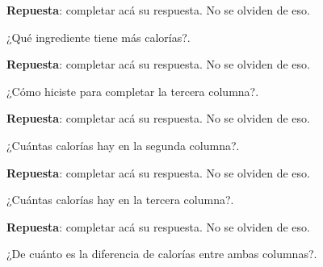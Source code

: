 \documentclass[10pt]{examdesign}
\begin{document}
\begin{shortanswer}[title={\textit{Receta que le dijo la Abuela Pocha a Ana y
    			Juan.}},
    	rearrange=no,resetcounter=no]
\begin{question}
\begin{center}
\begin{tabular}{|c|c|c|}
    			\end{tabular}
    		\end{center}
    		\begin{answer}
    			\textbf{Repuesta}: completar acá su respuesta. No se olviden de eso.
    		\end{answer}
    	\end{question}
        \begin{question}
        	¿Qué ingrediente tiene más calorías?.
        	\begin{answer}
        		\textbf{Repuesta}: completar acá su respuesta. No se olviden de eso.
        	\end{answer}
        \end{question}
        \begin{question}
        	¿Cómo hiciste para completar la tercera columna?.
        	\begin{answer}
        		\textbf{Repuesta}: completar acá su respuesta. No se olviden de eso.
        	\end{answer}
        \end{question}
        \begin{question}
        	¿Cuántas calorías hay en la segunda columna?.
        	\begin{answer}
        		\textbf{Repuesta}: completar acá su respuesta. No se olviden de eso.
        	\end{answer}
        \end{question}
        \begin{question}
        	¿Cuántas calorías hay en la tercera columna?.
        	\begin{answer}
        		\textbf{Repuesta}: completar acá su respuesta. No se olviden de eso.
        	\end{answer}
        \end{question}
        \begin{question}
        	¿De cuánto es la diferencia de calorías entre ambas columnas?.
        	\begin{answer}

\end{answer}
\end{question}
\end{shortanswer}
\end{document}
